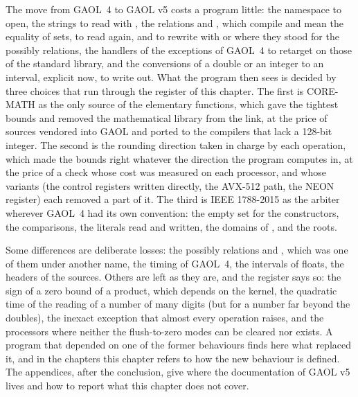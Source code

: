 The move from GAOL~4 to GAOL v5 costs a program little: the namespace to
open, the strings to read with , the relations
\code{==} and \code{!=}, which compile and mean the equality of sets, to read
again, and to rewrite with  or 
where they stood for the possibly relations, the handlers of the exceptions of GAOL~4 to
retarget on those of the standard library, and the conversions of a double or an integer
to an interval, explicit now, to write out. What the program then sees is
decided by three choices that run through the register of this chapter. The
first is CORE-MATH as the only source of the elementary functions, which gave
the tightest bounds and removed the mathematical library from the link, at
the price of sources vendored into GAOL and ported to the compilers that lack
a 128-bit integer. The second is the rounding direction taken in charge by
each operation, which made the bounds right whatever the direction the
program computes in, at the price of a check whose cost was measured on each
processor, and whose variants (the control registers written directly, the
AVX-512 path, the NEON register) each removed a part of it. The third is IEEE
1788-2015 as the arbiter wherever GAOL~4 had its own convention: the empty
set for the constructors, the comparisons, the literals read and written, the
domains of ,  and the roots.

\medskip
Some differences are deliberate losses: the possibly relations and
, which was one of them under another name, the timing of GAOL~4, the intervals of floats, the
headers of the sources. Others are left as they are, and the register says
so: the sign of a zero bound of a product, which depends on the kernel, the
quadratic time of the reading of a number of many digits (but for a number far
beyond the doubles), the inexact exception
that almost every operation raises, and the processors where neither the
flush-to-zero modes can be cleared nor  exists. A
program that depended on one of the former behaviours finds here what
replaced it, and in the chapters this chapter refers to how the new
behaviour is defined. The appendices, after the conclusion, give where the
documentation of GAOL v5 lives and how to report what this chapter does not
cover.
